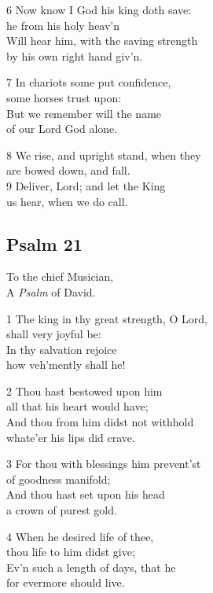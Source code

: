 \begin{multicols}{3}
6 Now know I God his king doth save:\\
he from his holy heav’n\\
Will hear him, with the saving strength\\
by his own right hand giv’n.

7 In chariots some put confidence,\\
some horses trust upon:\\
But we remember will the name\\
of our Lord God alone.

8 We rise, and upright stand, when they\\
are bowed down, and fall.\\
9 Deliver, Lord; and let the King\\
us hear, when we do call.

\begin{center}
\quad{}\quad{}
\end{center}

\subsection*{Psalm 21 }

To the chief Musician,\\
A \emph{Psalm} of David.

1 The king in thy great strength, O Lord,\\
shall very joyful be:\\
In thy salvation rejoice\\
how veh’mently shall he!

2 Thou hast bestowed upon him\\
all that his heart would have;\\
And thou from him didst not withhold\\
whate’er his lips did crave.

3 For thou with blessings him prevent’st\\
of goodness manifold;\\
And thou hast set upon his head\\
a crown of purest gold.

4 When he desired life of thee,\\
thou life to him didst give;\\
Ev’n such a length of days, that he\\
for evermore should live.


\end{multicols}
